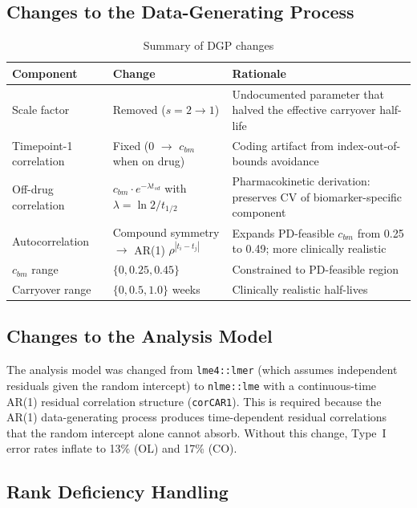 \documentclass[11pt]{article}
\begin{document}
\subsection{Changes to the Data-Generating Process}

\begin{table}[h]
\centering
\caption{Summary of DGP changes}
\small
\begin{tabular}{p{3cm}p{4cm}p{5.5cm}}
\toprule
Component & Change & Rationale \\
\midrule
Scale factor & Removed ($s=2 \to 1$) &
  Undocumented parameter that halved the effective
  carryover half-life \\
\midrule
Timepoint-1 correlation & Fixed (0 $\to$ $c_{bm}$ when
  on drug) &
  Coding artifact from index-out-of-bounds avoidance \\
\midrule
Off-drug correlation & $c_{bm} \cdot e^{-\lambda t_{sd}}$
  with $\lambda = \ln 2 / t_{1/2}$ &
  Pharmacokinetic derivation: preserves CV of
  biomarker-specific component \\
\midrule
Autocorrelation & Compound symmetry $\to$ AR(1)
  $\rho^{|t_i-t_j|}$ &
  Expands PD-feasible $c_{bm}$ from 0.25 to 0.49;
  more clinically realistic \\
\midrule
$c_{bm}$ range & $\{0, 0.25, 0.45\}$ &
  Constrained to PD-feasible region \\
\midrule
Carryover range & $\{0, 0.5, 1.0\}$ weeks &
  Clinically realistic half-lives \\
\bottomrule
\end{tabular}
\end{table}

\subsection{Changes to the Analysis Model}

The analysis model was changed from \texttt{lme4::lmer}
(which assumes independent residuals given the random
intercept) to \texttt{nlme::lme} with a continuous-time AR(1)
residual correlation structure (\texttt{corCAR1}). This is
required because the AR(1) data-generating process produces
time-dependent residual correlations that the random intercept
alone cannot absorb. Without this change, Type~I error rates
inflate to 13\% (OL) and 17\% (CO).

\subsection{Rank Deficiency Handling}
\end{document}
